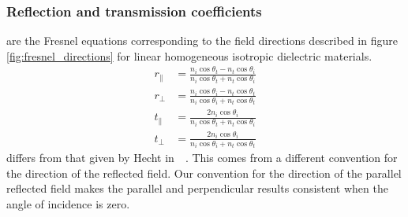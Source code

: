 \subsubsection{Reflection and transmission coefficients}
 are the Fresnel equations corresponding to the field directions described in figure \cref{fig:fresnel_directions} for linear homogeneous isotropic dielectric materials.
\begin{subequations}
    \begin{align}
        r_\parallel & =
        \frac{n_i \cos \theta_t - n_t \cos \theta_i}{n_i \cos \theta_t + n_t \cos \theta_i}
        \label{eq:fresnel_rp}
        \\
        r_\perp & =
        \frac{n_i \cos \theta_i - n_t \cos \theta_t}{n_i \cos \theta_i + n_t \cos \theta_t}
        \label{eq:fresnel_rs}
        \\
        t_\parallel & =
        \frac {2 n_i \cos \theta_i}{n_i \cos \theta_t + n_t \cos \theta_i}
        \label{eq:fresnel_tp}
        \\
        t_\perp & =
        \frac {2 n_i \cos \theta_i}{n_i \cos \theta_i + n_t \cos \theta_t}
        \label{eq:fresnel_ts}
    \end{align}
    \label{eq:fresnel_oblique}
\end{subequations}
 differs from that given by Hecht in~~\cite{hecht2002optics}.
This comes from a different convention for the direction of the reflected field.
Our convention for the direction of the parallel reflected field makes the parallel and perpendicular results consistent when the angle of incidence is zero.

%

